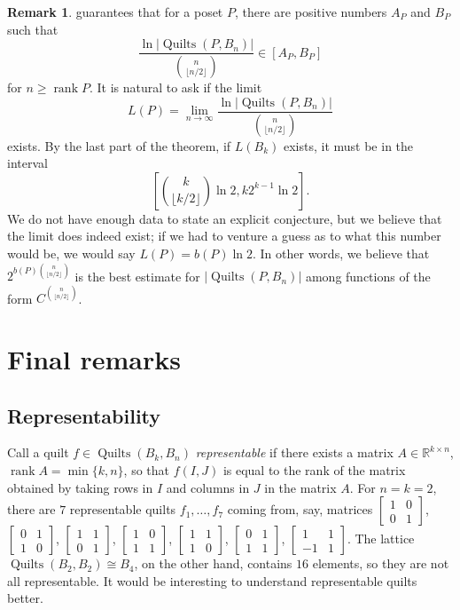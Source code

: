 \documentclass[12pt]{amsart}
\newcommand{\R}{{\mathbb R}}
\numberwithin{equation}{section}
\theoremstyle{definition}
\newtheorem{remark}[theorem]{Remark}
\newcommand{\floor}[1]{\lfloor {#1} \rfloor}
\newcommand{\quilt}{\operatorname{Quilts}}
\newcommand{\rank}{\operatorname{rank}}
\begin{document}
\begin{remark}
  guarantees that for a poset $P$, there are positive numbers $A_P$ and $B_P$ such that
 $$\frac{\ln |\quilt(P,B_n)|}{\binom{n}{\floor{n/2}}} \in [A_P,B_P]$$
 for $n \geq \rank P$.  It is natural to ask if the limit
 $$L(P) = \lim_{n \to \infty} \frac{\ln |\quilt(P,B_n)|}{\binom{n}{\floor{n/2}}}$$
 exists. By the last part of the theorem, if $L(B_k)$ exists, it must be in the interval
 $$\left[\binom k{\floor{k/2}} \ln 2, k2^{k-1} \ln 2\right].$$
We do not have enough data to state an explicit conjecture, but we believe that the limit does indeed exist; if we had to venture a guess as to what this number would be, we would say $L(P) = b(P) \ln 2$. In other words, we believe that $2^{b(P) \binom n{\floor{n/2}}}$ is the best estimate for $|\quilt(P,B_n)|$ among functions of the form $C^{\binom n{\floor{n/2}}}$.
\end{remark}


\section{Final remarks} \label{sec:final}


\subsection*{Representability}

Call a quilt $f \in \quilt(B_k, B_n)$ \emph{representable} if there
exists a matrix $A \in \R^{k \times n}$, $\rank A = \min\{k,n\}$, so
that $f(I,J)$ is equal to the rank of the matrix obtained by taking
rows in $I$ and columns in $J$ in the matrix $A$. For $n = k = 2$,
there are $7$ representable quilts $f_1,\ldots,f_7$ coming from, say,
matrices $\left[ \begin{smallmatrix} 1 & 0 \\ 0 & 1 \end{smallmatrix}
\right]$, $\left[ \begin{smallmatrix} 0 & 1 \\ 1 & 0 \end{smallmatrix}
\right]$, $\left[ \begin{smallmatrix} 1 & 1 \\ 0 & 1 \end{smallmatrix}
\right]$, $\left[ \begin{smallmatrix} 1 & 0 \\ 1 & 1 \end{smallmatrix}
\right]$, $\left[ \begin{smallmatrix} 1 & 1 \\ 1 & 0 \end{smallmatrix}
\right]$, $\left[ \begin{smallmatrix} 0 & 1 \\ 1 & 1 \end{smallmatrix}
\right]$, $\left[ \begin{smallmatrix} 1 & 1 \\ -1 &
1 \end{smallmatrix} \right]$.  The lattice $\quilt(B_2, B_2) \cong
B_4$, on the other hand, contains $16$ elements, so they are not all representable.  It would be
interesting to understand representable quilts better.
\end{document}
